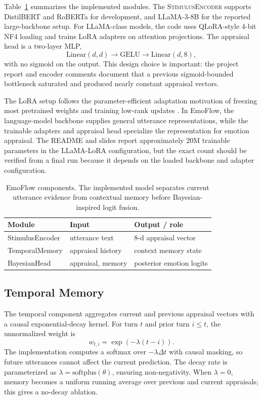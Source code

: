 \documentclass[11pt]{article}
\begin{document}
Table~\ref{tab:components} summarizes the implemented modules. The \textsc{StimulusEncoder} supports DistilBERT and RoBERTa for development, and LLaMA-3-8B for the reported large-backbone setup. For LLaMA-class models, the code uses QLoRA-style 4-bit NF4 loading and trains LoRA adapters on attention projections. The appraisal head is a two-layer MLP,
\[
\mathrm{Linear}(d,d) \rightarrow \mathrm{GELU} \rightarrow \mathrm{Linear}(d,8),
\]
with no sigmoid on the output. This design choice is important: the project report and encoder comments document that a previous sigmoid-bounded bottleneck saturated and produced nearly constant appraisal vectors.

The LoRA setup follows the parameter-efficient adaptation motivation of freezing most pretrained weights and training low-rank updates \citep{hu2021lora}. In EmoFlow, the language-model backbone supplies general utterance representations, while the trainable adapters and appraisal head specialize the representation for emotion appraisal. The README and slides report approximately 20M trainable parameters in the LLaMA-LoRA configuration, but the exact count should be verified from a final run because it depends on the loaded backbone and adapter configuration.

\begin{table}[t]
\centering
\small
\begin{tabular}{lll}
\toprule
Module & Input & Output / role \\
\midrule
StimulusEncoder & utterance text & 8-d appraisal vector \\
TemporalMemory & appraisal history & context memory state \\
BayesianHead & appraisal, memory & posterior emotion logits \\
\bottomrule
\end{tabular}
\caption{EmoFlow components. The implemented model separates current utterance evidence from contextual memory before Bayesian-inspired logit fusion.}
\label{tab:components}
\end{table}

\subsection{Temporal Memory}

The temporal component aggregates current and previous appraisal vectors with a causal exponential-decay kernel. For turn $t$ and prior turn $i \leq t$, the unnormalized weight is
\[
w_{t,i} = \exp(-\lambda (t-i)).
\]
The implementation computes a softmax over $-\lambda \Delta t$ with causal masking, so future utterances cannot affect the current prediction. The decay rate is parameterized as $\lambda=\mathrm{softplus}(\theta)$, ensuring non-negativity. When $\lambda=0$, memory becomes a uniform running average over previous and current appraisals; this gives a no-decay ablation.
\end{document}
